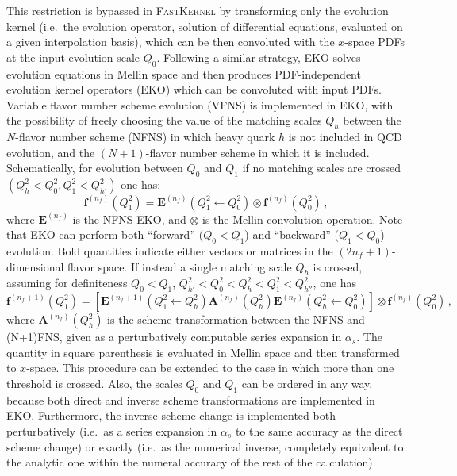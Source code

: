 This restriction is bypassed in \textsc{\small FastKernel} by transforming only the
evolution kernel (i.e.\ the evolution operator, solution of differential
equations, evaluated on a given interpolation basis), which can be then
convoluted with the $x$-space PDFs at the input evolution scale $Q_0$.
Following a similar strategy, \textsc{\small EKO}
solves evolution equations in Mellin space and then produces PDF-independent
evolution kernel operators (EKO) which can be convoluted with input 
PDFs.
%
Variable flavor number scheme evolution (VFNS) is implemented in \textsc{\small EKO}, with
the possibility of freely choosing the value of the matching scales
$Q_{h}$ between the $N$-flavor number scheme (NFNS) in which heavy quark $h$
is not included in QCD evolution, and the $(N+1)$-flavor number
scheme in which it is included.
%
Schematically, for evolution between $Q_0$ and $Q_1$ if no matching
scales are crossed $\left(Q_{h}^2 < Q_0^2 , Q_1^2 < Q_{h'}^2\right)$ one has:
\begin{equation}
\label{eq:ic/EKO1}
{\mathbf{f}}^{(n_f)}(Q^2_1)= {\mathbf{E}}^{(n_f)}(Q^2_1\leftarrow Q^2_0) \otimes {\mathbf{f}}^{(n_f)}(Q^2_0) \, ,
\end{equation}
where
${\mathbf{E}}^{(n_f)}$ is the  NFNS \textsc{\small EKO},
and $\otimes$ is the Mellin convolution operation. Note that \textsc{\small EKO}
can perform both ``forward'' ($Q_0< Q_1$)  and ``backward'' ($Q_1< Q_0$)
evolution.
%
Bold quantities indicate either vectors or matrices
in the $(2n_f+1)$-dimensional flavor space.
If instead a single matching scale $Q_h$ is crossed, assuming for definiteness $Q_0< Q_1$,  
$Q_{h'}^2 < Q_0^2 < Q_{h}^2 < Q_1^2 < Q_{h''}^2$,
one has
\begin{equation}
\label{eq:ic/EKO2}
{\mathbf{f}}^{(n_f+1)}(Q^2_1)= \left[ {\mathbf{E}}^{(n_f+1)}(Q^2_1\leftarrow Q_{h}^2)  
{\mathbf{A}}^{(n_f)}(Q_{h}^2) {\mathbf{E}}^{(n_f)}(Q_{h}^2\leftarrow Q^2_0) \right] \otimes {\mathbf{f}}^{(n_f)}(Q^2_0) \, ,
\end{equation}
where $\mathbf{A}^{(n_f)}(Q_{h}^2)$ is the scheme transformation
between the NFNS and (N+1)FNS, given as a perturbatively computable
series expansion in $\alpha_s$. 
%
The quantity in square parenthesis is evaluated in Mellin space and then transformed to $x$-space.
%
This procedure can be  extended to the case in which  more than
one threshold is crossed.
%
Also, the scales $Q_0$ and $Q_1$ can be ordered in any way, because both direct
and inverse scheme transformations are implemented in
\textsc{\small EKO}. Furthermore, the inverse scheme change  is implemented both
perturbatively (i.e.\ as a series expansion in $\alpha_s$ to the same
accuracy as the direct scheme change) or exactly (i.e.\ as the numerical
inverse, completely equivalent to the analytic one within the numeral accuracy
of the rest of the calculation).

